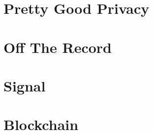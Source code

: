 \section{Pretty Good Privacy}
\label{sec:pgp}

\section{Off The Record}
\label{sec:otr}

\section{Signal}
\label{sec:signal}


\section{Blockchain}
\label{sec:blockchain}


